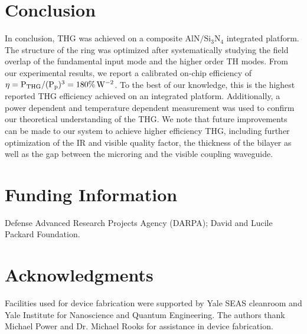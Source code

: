 \documentclass[9pt,twocolumn,twoside]{optica}
\begin{document}
\section{Conclusion}

In conclusion, THG was achieved on a composite $\mathrm{AlN} / \mathrm{Si_{3}N_{4}}$ integrated platform. The structure of the ring was optimized after systematically studying the field overlap of the fundamental input mode and the higher order TH modes. From our experimental results, we report a calibrated on-chip efficiency of $\eta=\mathrm{P_{THG}}/(\mathrm{P_{p}})^{3}=180\%\thinspace\mathrm{W^{-2}}$. To the best of our knowledge, this is the highest reported THG efficiency achieved on an integrated platform. Additionally, a power dependent and temperature dependent measurement was used to confirm our theoretical understanding of the THG. We note that future improvements can be made to our system to achieve higher efficiency THG, including further optimization of the IR and visible quality factor, the thickness of the bilayer as well as the gap between the microring and the visible coupling waveguide.

\section*{Funding Information}
Defense Advanced Research Projects Agency (DARPA); David and Lucile Packard Foundation.

\section*{Acknowledgments}

Facilities used for device fabrication were supported by Yale SEAS cleanroom and Yale Institute for Nanoscience and Quantum Engineering. The authors thank Michael Power and Dr. Michael Rooks for assistance in device fabrication.



\end{document}
